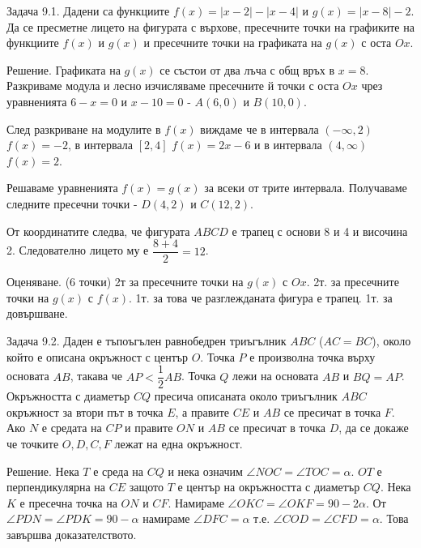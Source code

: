 
Задача 9.1. Дадени са функциите $f(x)=|x-2|-|x-4|$ и $g(x)=|x-8|-2$. Да се пресметне лицето на фигурата с върхове, пресечните точки на графиките на функциите $f(x)$ и $g(x)$ и пресечните точки на графиката на $g(x)$ с оста $Ox$.

Решение. Графиката на $g(x)$ се състои от два лъча с общ връх в $x=8$. Разкриваме модула и лесно изчисляваме пресечните й точки с оста $Ox$ чрез уравненията $6-x=0$ и $x-10=0$ - $A(6,0)$ и $B(10,0)$.

След разкриване на модулите в $f(x)$ виждаме че в интервала $(-\infty,2)$ $f(x)=-2$, в интервала $[2,4]$ $f(x)=2x-6$ и в интервала $(4,\infty)$ $f(x)=2$.

Решаваме уравненията $f(x)=g(x)$ за всеки от трите интервала. Получаваме следните пресечни точки - $D(4,2)$ и $C(12,2)$.

От координатите следва, че фигурата $ABCD$ е трапец с основи 8 и 4 и височина 2. Следователно лицето му е $\dfrac{8+4}{2}=12$.

Оценяване. (6 точки) 2т за пресечните точки на $g(x)$ с $Ox$. 2т. за пресечните точки на $g(x)$ с $f(x)$. 1т. за това че разглежданата фигура е трапец. 1т. за довършване.

Задача 9.2. Даден е тъпоъгълен равнобедрен триъгълник $ABC$ ($AC=BC$), около който е описана окръжност с център $O$. Точка $P$ е произволна точка върху основата $AB$, такава че $AP<\dfrac12AB$. Точка $Q$ лежи на основата $AB$ и $BQ=AP$. Окръжността с диаметър $CQ$ пресича описаната около триъгълник $ABC$ окръжност за втори път в точка $E$, а правите $CE$ и $AB$ се пресичат в точка $F$. Ако $N$ е средата на $CP$ и правите $ON$ и $AB$ се пресичат в точка $D$, да се докаже че точките $O,D,C,F$ лежат на една окръжност.

Решение. Нека $T$ е среда на $CQ$ и нека означим $\angle NOC=\angle TOC=\alpha$. $OT$ е перпендикулярна на $CE$ защото $T$ е център на окръжността с диаметър $CQ$. Нека $K$ е пресечна точка на $ON$ и $CF$. Намираме $\angle OKC=\angle OKF=90-2\alpha$. От $\angle PDN=\angle PDK=90-\alpha$ намираме $\angle DFC=\alpha$ т.е. $\angle COD=\angle CFD=\alpha$. Това завършва доказателството.

